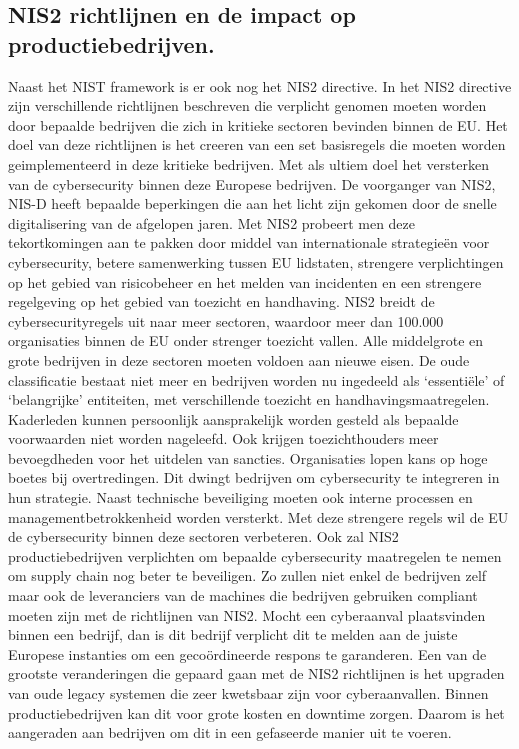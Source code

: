 \subsection{NIS2 richtlijnen en de impact op productiebedrijven.}
Naast het NIST framework is er ook nog het NIS2 directive. In het NIS2 directive zijn verschillende richtlijnen beschreven die verplicht genomen moeten worden door bepaalde bedrijven die zich in kritieke sectoren bevinden binnen de EU. Het doel van deze richtlijnen is het creeren van een set basisregels die moeten worden geimplementeerd in deze kritieke bedrijven. Met als ultiem doel het versterken van de cybersecurity binnen deze Europese bedrijven. \autocite{VanLeeuwen2025}
De voorganger van NIS2, NIS-D heeft bepaalde beperkingen die aan het licht zijn gekomen door de snelle digitalisering van de afgelopen jaren. Met NIS2 probeert men deze tekortkomingen aan te pakken door middel van internationale strategieën voor cybersecurity, betere samenwerking tussen EU lidstaten, strengere verplichtingen op het gebied van risicobeheer en het melden van incidenten en een strengere regelgeving op het gebied van toezicht en handhaving. \autocite{Ey2025}
NIS2 breidt de cybersecurityregels uit naar meer sectoren, waardoor meer dan 100.000 organisaties binnen de EU onder strenger toezicht vallen. Alle middelgrote en grote bedrijven in deze sectoren moeten voldoen aan nieuwe eisen. De oude classificatie bestaat niet meer en bedrijven worden nu ingedeeld als ‘essentiële’ of ‘belangrijke’ entiteiten, met verschillende toezicht en handhavingsmaatregelen. Kaderleden kunnen persoonlijk aansprakelijk worden gesteld als bepaalde voorwaarden niet worden nageleefd. Ook krijgen toezichthouders meer bevoegdheden voor het uitdelen van sancties. Organisaties lopen kans op hoge boetes bij overtredingen. Dit dwingt bedrijven om cybersecurity te integreren in hun strategie. Naast technische beveiliging moeten ook interne processen en managementbetrokkenheid worden versterkt. Met deze strengere regels wil de EU de cybersecurity binnen deze sectoren verbeteren. \autocite{Ey2025}
Ook zal NIS2 productiebedrijven verplichten om bepaalde cybersecurity maatregelen te nemen om supply chain nog beter te beveiligen. Zo zullen niet enkel de bedrijven zelf maar ook de leveranciers van de machines die bedrijven gebruiken compliant moeten zijn met de richtlijnen van NIS2. Mocht een cyberaanval plaatsvinden binnen een bedrijf, dan is dit bedrijf verplicht dit te melden aan de juiste Europese instanties om een gecoördineerde respons te garanderen. Een van de grootste veranderingen die gepaard gaan met de NIS2 richtlijnen is het upgraden van oude legacy systemen die zeer kwetsbaar zijn voor cyberaanvallen. Binnen productiebedrijven kan dit voor grote kosten en downtime zorgen. Daarom is het aangeraden aan bedrijven om dit in een gefaseerde manier uit te voeren. \autocite{Lansweeper2024}


